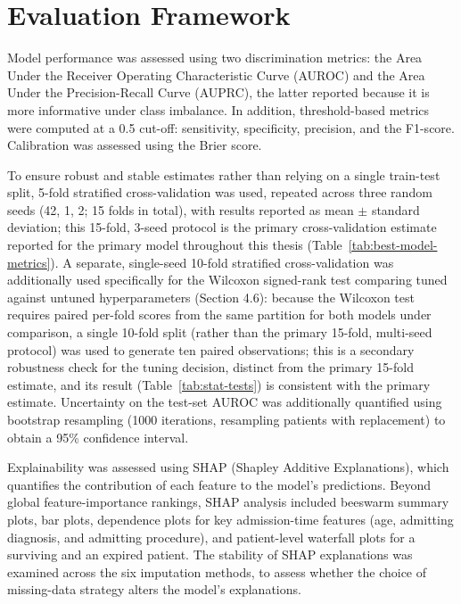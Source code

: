 \documentclass[12pt,a4paper]{report}
\begin{document}
\section{Evaluation Framework}
Model performance was assessed using two discrimination metrics: the Area Under the Receiver Operating Characteristic Curve (AUROC) and the Area Under the Precision-Recall Curve (AUPRC), the latter reported because it is more informative under class imbalance. In addition, threshold-based metrics were computed at a 0.5 cut-off: sensitivity, specificity, precision, and the F1-score. Calibration was assessed using the Brier score.

To ensure robust and stable estimates rather than relying on a single train-test split, 5-fold stratified cross-validation was used, repeated across three random seeds (42, 1, 2; 15 folds in total), with results reported as mean $\pm$ standard deviation; this 15-fold, 3-seed protocol is the primary cross-validation estimate reported for the primary model throughout this thesis (Table~\ref{tab:best-model-metrics}). A separate, single-seed 10-fold stratified cross-validation was additionally used specifically for the Wilcoxon signed-rank test comparing tuned against untuned hyperparameters (Section 4.6): because the Wilcoxon test requires paired per-fold scores from the same partition for both models under comparison, a single 10-fold split (rather than the primary 15-fold, multi-seed protocol) was used to generate ten paired observations; this is a secondary robustness check for the tuning decision, distinct from the primary 15-fold estimate, and its result (Table~\ref{tab:stat-tests}) is consistent with the primary estimate. Uncertainty on the test-set AUROC was additionally quantified using bootstrap resampling (1000 iterations, resampling patients with replacement) to obtain a 95\% confidence interval.

Explainability was assessed using SHAP (Shapley Additive Explanations), which quantifies the contribution of each feature to the model's predictions. Beyond global feature-importance rankings, SHAP analysis included beeswarm summary plots, bar plots, dependence plots for key admission-time features (age, admitting diagnosis, and admitting procedure), and patient-level waterfall plots for a surviving and an expired patient. The stability of SHAP explanations was examined across the six imputation methods, to assess whether the choice of missing-data strategy alters the model's explanations.
\end{document}
